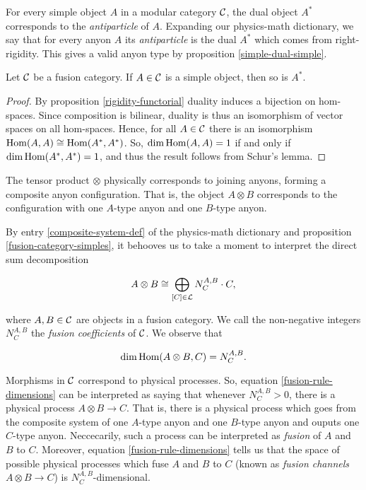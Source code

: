 \begin{dict}\label{antiparticle-definition}
For every simple object $A$ in a modular category ${\mathcal C}$, the dual object $A^*$ corresponds to the {\em antiparticle} of $A$.
Expanding our physics-math dictionary, we say that for every anyon $A$ its {\em antiparticle} is the dual $A^*$ which comes from right-rigidity. This gives a valid anyon type by proposition \ref{simple-dual-simple}.
\end{dict}

\begin{prop}\label{simple-dual-simple} Let ${\mathcal C}$ be a fusion category. If $A\in {\mathcal C}$ is a simple object, then so is $A^*$.
\end{prop}
\begin{proof} By proposition \ref{rigidity-functorial} duality induces a bijection on hom-spaces. Since composition is bilinear, duality is thus an isomorphism of vector spaces on all hom-spaces. Hence, for all $A\in {\mathcal C}$ there is an isomorphism $\operatorname{Hom}(A,A)\cong \operatorname{Hom}(A^*,A^*)$.  So, $\dim \operatorname{Hom}(A,A)= 1$ if and only if $\dim \operatorname{Hom}(A^*,A^*)=1$, and thus the result follows from Schur's lemma.
\end{proof}

\begin{dict}\label{composite-system-def}
The tensor product $\otimes$ physically corresponds to joining anyons, forming a composite anyon configuration. That is, the object $A\otimes B$ corresponds to the configuration with one $A$-type anyon and one $B$-type anyon.
\end{dict}

\begin{rem} By entry \ref{composite-system-def} of the physics-math dictionary and proposition \ref{fusion-category-simples}, it behooves us to take a moment to interpret the direct sum decomposition

\begin{equation}
A\otimes B \cong \bigoplus_{[C]\in {\mathcal L}}N^{A,B}_{C}\cdot C,
\end{equation}

where $A,B\in {\mathcal C}$ are objects in a fusion category. We call the non-negative integers $N^{A,B}_C$ the {\em fusion coefficients} of ${\mathcal C}$. We observe that

\begin{equation}\label{fusion-rule-dimensions}
\dim \operatorname{Hom}(A\otimes B, C)=N^{A,B}_C.
\end{equation}

Morphisms in ${\mathcal C}$ correspond to physical processes. So, equation \ref{fusion-rule-dimensions} can be interpreted as saying that whenever $N^{A,B}_{C}>0$, there is a physical process $A\otimes B\to C$. That is, there is a physical process which goes from the composite system of one $A$-type anyon and one $B$-type anyon and ouputs one $C$-type anyon. Neccecarily, such a process can be interpreted as {\em fusion} of $A$ and $B$ to $C$. Moreover, equation \ref{fusion-rule-dimensions} tells us that the space of possible physical processes which fuse $A$ and $B$ to $C$ (known as {\em fusion channels} $A\otimes B\to C$) is $N^{A,B}_C$-dimensional.
\end{rem}

